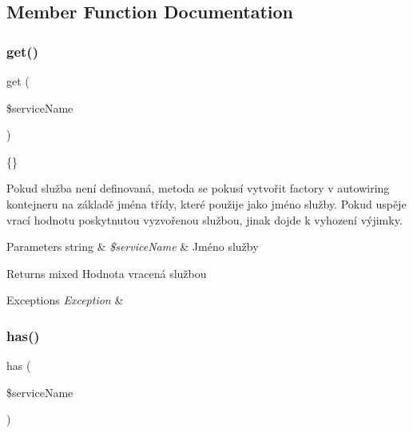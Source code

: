 \subsection{Member Function Documentation}
\mbox{\label{class_pes_1_1_container_1_1_autowiring_container_a1a84a087ff94c2fb4af5e4b25d2b2d53}} 
\subsubsection{\texorpdfstring{get()}{get()}}
{\footnotesize\ttfamily get (\begin{DoxyParamCaption}\item[{}]{\$service\+Name }\end{DoxyParamCaption})}

\{\}

Pokud služba není definovaná, metoda se pokusí vytvořit factory v autowiring kontejneru na základě jména třídy, které použije jako jméno služby. Pokud uspěje vrací hodnotu poskytnutou vyzvořenou službou, jinak dojde k vyhození výjimky.


\begin{DoxyParams}[1]{Parameters}
string & {\em \$service\+Name} & Jméno služby \\
\hline
\end{DoxyParams}
\begin{DoxyReturn}{Returns}
mixed Hodnota vracená službou 
\end{DoxyReturn}

\begin{DoxyExceptions}{Exceptions}
{\em Exception} & \\
\hline
\end{DoxyExceptions}
\mbox{\label{class_pes_1_1_container_1_1_autowiring_container_a91d786bf5e60430567a9de84ebbcbfdd}} 
\subsubsection{\texorpdfstring{has()}{has()}}
{\footnotesize\ttfamily has (\begin{DoxyParamCaption}\item[{}]{\$service\+Name }\end{DoxyParamCaption})}

